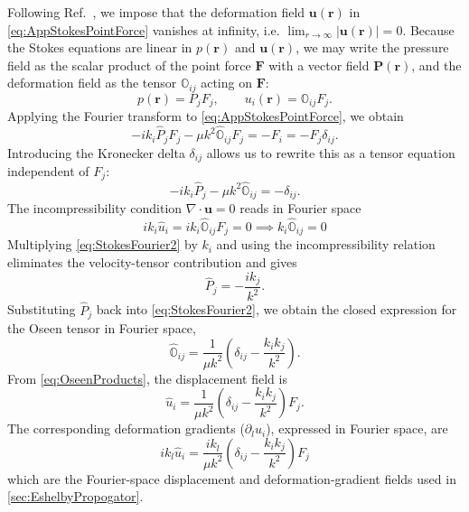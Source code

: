 \documentclass[asymmetricmargins]{library/duthesis}%
\begin{document}
\begin{subappendices}
Following Ref.~\cite{kim_microhydrodynamics_1991}, we impose that the deformation field $\bm{u}(\bm{r})$ in \cref{eq:AppStokesPointForce} vanishes at infinity, i.e. $\lim_{r \to \infty}|\bm{u}(\bm{r})| = 0$. Because the Stokes equations are linear in $p(\bm{r})$ and $\bm{u}(\bm{r})$, we may write the pressure field as the scalar product of the point force $\bm{F}$ with a vector field $\bm{P}(\bm{r})$, and the deformation field as the tensor $\mathbb{O}_{ij}$ acting on $\bm{F}$:
\begin{equation}
    p(\bm{r}) = P_j F_j, \qquad
    u_i(\bm{r}) = \mathbb{O}_{ij} F_j.
    \label{eq:OseenProducts}
\end{equation}
Applying the Fourier transform to \cref{eq:AppStokesPointForce}, we obtain
\begin{equation*}
- i k_i \hat{P}_j F_j 
- \mu k^2 \hat{\mathbb{O}}_{ij} F_j 
= -F_i = -F_j \delta_{ij}.
\end{equation*}
Introducing the Kronecker delta $\delta_{ij}$ allows us to rewrite this as a tensor equation independent of $F_j$:
\begin{equation}
    - i k_i \hat{P}_j 
    - \mu k^2 \hat{\mathbb{O}}_{ij} 
    = -\delta_{ij}.
    \label{eq:StokesFourier2}
\end{equation}
The incompressibility condition $\nabla \cdot \bm{u} = 0$ reads in Fourier space
\[
    ik_i\hat{u}_i=ik_i\hat{\mathbb{O}}_{ij} F_j=0 \implies k_i\hat{\mathbb{O}}_{ij} = 0
\]
Multiplying \cref{eq:StokesFourier2} by $k_i$ and using the incompressibility relation eliminates the velocity-tensor contribution and gives
\begin{equation*}
    \hat{P}_j = -\frac{ik_j}{k^2}.
\end{equation*}
Substituting $\hat{P}_j$ back into \cref{eq:StokesFourier2}, we obtain the closed expression for the Oseen tensor in Fourier space,
\begin{equation}
    \hat{\mathbb{O}}_{ij} = \frac{1}{\mu k^2}\left( \delta_{ij} - \frac{k_ik_j}{k^2} \right).
    \label{eq:AppOseenPointForce}
\end{equation}
From \cref{eq:OseenProducts}, the displacement field is
\begin{equation}
    \hat{u}_i = \frac{1}{\mu k^2}\left( \delta_{ij} - \frac{k_ik_j}{k^2} \right)F_j.
    \label{eq:AppFourierDeformationPointForce}
\end{equation}
The corresponding deformation gradients ($\partial_l u_i$), expressed in Fourier space, are
\begin{equation}
    ik_l\hat{u}_i = \frac{ik_l}{\mu k^2}\left( \delta_{ij} - \frac{k_ik_j}{k^2} \right)F_j
    \label{eq:AppFourierDeformationGradientPointForce}
\end{equation}
which are the Fourier-space displacement and deformation-gradient fields used in \cref{sec:EshelbyPropogator}.


\end{subappendices}
\end{document}
